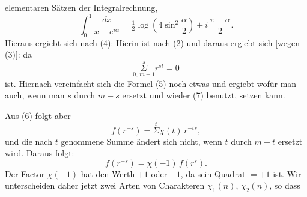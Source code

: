elementaren Sätzen der Integralrechnung, 
\[
\int_0^1 \frac{dx}{x-e^{i\alpha}} = \tfrac{1}{2}\log\left(4\sin^2\frac{\alpha}{2}\right) + i\,\frac{\pi-\alpha}{2}.
\]
Hieraus ergiebt sich nach (4):
Hierin ist nach (2)
und daraus ergiebt sich [wegen (3)]:
da
\[
\underset{0,\,m-1}{\overset{s}{\Sigma}} r^{st} = 0
\]
ist. Hiernach vereinfacht sich die Formel (5) noch etwas und ergiebt
wofür man auch, wenn man $s$ durch $m-s$ ersetzt und wieder (7) benutzt,
setzen kann.

Aus (6) folgt aber
\[
f(r^{-s}) = \overset{t}{\Sigma}\chi(t)\,r^{-ts},
\]
und die nach $t$ genommene Summe ändert sich nicht, wenn $t$ durch $m-t$
ersetzt wird. Daraus folgt:
\[
f(r^{-s}) = \chi(-1)\,f(r^s).
\]
Der Factor $\chi(-1)$ hat den Werth $+1$ oder $-1$, da sein Quadrat $=+1$
ist. Wir unterscheiden daher jetzt zwei Arten von Charakteren $\chi_1(n)$,
$\chi_2(n)$, so dass
